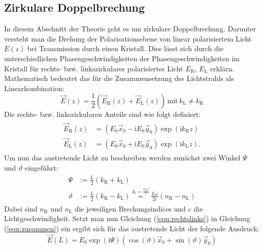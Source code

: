 \subsection{Zirkulare Doppelbrechung}
\label{sec:zirkulare_doppelbrechung}
In diesem Abschnitt der Theorie geht es um zirkulare Doppelbrechung. Darunter versteht man die Drehung der Polarisationsebene von linear polarisiertem Licht $E(z)$ bei Transmission durch einen Kristall.
Dies lässt sich durch die unterschiedlichen Phasengeschwindigkeiten der Phasengeschwindigkeiten im Kristall für rechts- bzw. linkszirkulares polarisiertes Licht $E_\mathrm{R}$, $E_\mathrm{L}$ erklärn. Mathematisch bedeutet das für
die Zusammensetzung des Lichtstrahls als Linearkombination:
\begin{equation}
  \label{eqn:zusammen}
  \vec{E}(z)=\dfrac{1}{2}(\vec{E}_\mathrm{R}(z)+\vec{E}_\mathrm{L}(z)) \, \mathrm{mit} \, k_\mathrm{L}\neq k_\mathrm{R}
\end{equation}
Die rechts- bzw. linkszirkularen Anteile sind wie folgt definiert:
\begin{align}
  \label{eqn:rechtslinks}
  \begin{aligned}
  \vec{E}_\mathrm{R}(z) &= \left(E_\mathrm{0} \vec{x}_\mathrm{0} - \mathrm{i}E_\mathrm{0}\vec{y}_\mathrm{0}\right)\exp\left(\mathrm{i}{k}_\mathrm{R}z\right)\\
  \vec{E}_\mathrm{L}(z) &= \left(E_\mathrm{0} \vec{x}_\mathrm{0} + \mathrm{i}E_\mathrm{0}\vec{y}_\mathrm{0}\right)\exp\left(\mathrm{i}{k}_\mathrm{L}z\right).
\end{aligned}
\end{align}
Um nun das austretende Licht zu beschreiben werden zunächst zwei Winkel $\Psi$ und $\vartheta$ eingeführt:
\begin{align}
  \label{eqn:winkel}
  \begin{aligned}
    \Psi&:=\frac{L}{2}(k_\mathrm{R}+k_\mathrm{L}) \\
    \vartheta &:= \frac{L}{2}(k_\mathrm{R}-k_\mathrm{L}) \overset{k_\mathrm{i}=\frac{n_\mathrm{i}\omega}{c}}{=} \frac{L\omega}{2c}\left(n_\mathrm{R}-n_\mathrm{L}\right)
\end{aligned}
\end{align}
Dabei sind $n_\mathrm{R}$ und $n_\mathrm{L}$ die jeweiligen Brechungsindices und $c$ die Lichtgeschwindigkeit.
Setzt man nun Gleichung (\ref{eqn:rechtslinks}) in Gleichung (\ref{eqn:zusammen}) ein ergibt sich für das austretende Licht der folgende Ausdruck:
\begin{equation*}
  \vec{E}(L)=E_\mathrm{0} \exp(\mathrm{i}\Psi)\left(\cos(\vartheta) \vec{x}_\mathrm{0} + \sin(\vartheta)\vec{y}_\mathrm{0}\right)
\end{equation*}
